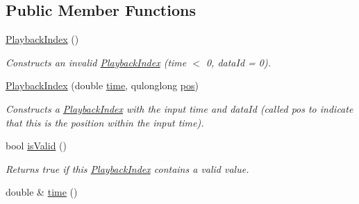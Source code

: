 \subsection*{Public Member Functions}
\begin{DoxyCompactItemize}
\item 
\hypertarget{struct_picto_1_1_playback_index_a84fe62af2a226c426453e349913dd7b4}{\hyperlink{struct_picto_1_1_playback_index_a84fe62af2a226c426453e349913dd7b4}{Playback\-Index} ()}\label{struct_picto_1_1_playback_index_a84fe62af2a226c426453e349913dd7b4}

\begin{DoxyCompactList}\small\item\em Constructs an invalid \hyperlink{struct_picto_1_1_playback_index}{Playback\-Index} (time $<$ 0, data\-Id = 0). \end{DoxyCompactList}\item 
\hyperlink{struct_picto_1_1_playback_index_ae4dec9366224c1c3085266d8bc324961}{Playback\-Index} (double \hyperlink{struct_picto_1_1_playback_index_acbf8f826cfd64d647a098ed165dd3999}{time}, qulonglong \hyperlink{struct_picto_1_1_playback_index_a1a046d21d2744bbb5e35431307819e02}{pos})
\begin{DoxyCompactList}\small\item\em Constructs a \hyperlink{struct_picto_1_1_playback_index}{Playback\-Index} with the input time and data\-Id (called pos to indicate that this is the position within the input time). \end{DoxyCompactList}\item 
\hypertarget{struct_picto_1_1_playback_index_a1771a73cc40e9fb0e0ae31e2080ff266}{bool \hyperlink{struct_picto_1_1_playback_index_a1771a73cc40e9fb0e0ae31e2080ff266}{is\-Valid} ()}\label{struct_picto_1_1_playback_index_a1771a73cc40e9fb0e0ae31e2080ff266}

\begin{DoxyCompactList}\small\item\em Returns true if this \hyperlink{struct_picto_1_1_playback_index}{Playback\-Index} contains a valid value. \end{DoxyCompactList}\item 
\hypertarget{struct_picto_1_1_playback_index_acbf8f826cfd64d647a098ed165dd3999}{double \& \hyperlink{struct_picto_1_1_playback_index_acbf8f826cfd64d647a098ed165dd3999}{time} ()}\label{struct_picto_1_1_playback_index_acbf8f826cfd64d647a098ed165dd3999}


\end{DoxyCompactItemize}
